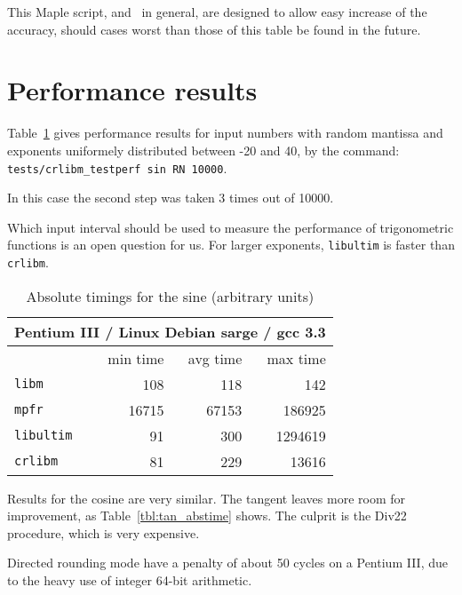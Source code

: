 This Maple script, and \crlibm\ in general, are designed to allow easy
increase of the accuracy, should cases worst than those of this table
be found in the future.


\section{Performance results}

Table~\ref{tbl:sine_abstime} gives performance results for input numbers with random
mantissa and exponents uniformely distributed between -20 and 40, by the command:\\
\verb!tests/crlibm_testperf sin RN 10000!.

In this case the second step was taken 3 times out of 10000.

Which input interval should be used to measure the performance of
trigonometric functions is an open question for us. For larger
exponents, \texttt{libultim} is faster than \texttt{crlibm}.

\begin{table}[!htb]
\begin{center}
\renewcommand{\arraystretch}{1.2}
\begin{tabular}{|l|r|r|r|}
\hline
 \multicolumn{4}{|c|}{Pentium III / Linux Debian sarge / gcc 3.3}   \\ 
 \hline
                        & min time       & avg time     & max time        \\ 
 \hline
 \texttt{libm}          & 108           &        118    & 142      \\ 
 \hline
 \texttt{mpfr}          & 16715         &      67153    & 186925      \\ 
 \hline
 \texttt{libultim}      & 91            &        300    & 1294619      \\ 
 \hline
\texttt{crlibm}         & 81            &        229    & 13616      \\ 
 \hline
\end{tabular}
\end{center}
\caption{Absolute timings for the sine (arbitrary units)
  \label{tbl:sine_abstime}}
\end{table}

Results for the cosine are very similar. The tangent leaves more room
for improvement, as Table~\ref{tbl:tan_abstime} shows. The culprit is
the Div22 procedure, which is very expensive. 

Directed rounding mode have a penalty of about 50 cycles on a Pentium
III, due to the heavy use of integer 64-bit arithmetic.

